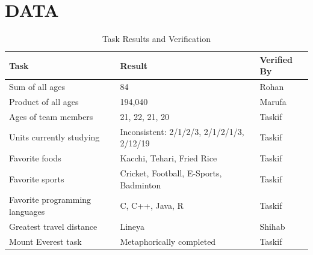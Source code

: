 \chapter{DATA} \label{ch:data}
\begin{table}[h]
\centering
\caption{Task Results and Verification}
\begin{tabular}{@{}p{5cm}p{4cm}p{3cm}@{}}
\toprule
\textbf{Task} & \textbf{Result} & \textbf{Verified By} \\
\midrule
Sum of all ages & 84 & Rohan \\
Product of all ages & 194,040 & Marufa \\
Ages of team members & 21, 22, 21, 20 & Taskif \\
Units currently studying & Inconsistent: 2/1/2/3, 2/1/2/1/3, 2/12/19 & Taskif \\
Favorite foods & Kacchi, Tehari, Fried Rice & Taskif \\
Favorite sports & Cricket, Football, E-Sports, Badminton & Taskif \\
Favorite programming languages & C, C++, Java, R & Taskif \\
Greatest travel distance & Lineya & Shihab \\
Mount Everest task & Metaphorically completed & Taskif \\
\bottomrule
\end{tabular}
\label{tab:results}
\end{table}
